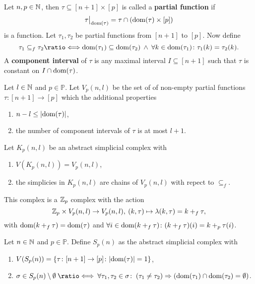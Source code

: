 \begin{defin}
  Let $n, p \in \mathbb{N}$, then $\tau \subseteq [n+1] \times [p]$ is called a \textbf{partial function} if \[\restr{\tau}{\dom(\tau)} = \tau \cap (\dom(\tau) \times [p])\] is a function. Let $\tau_1, \tau_2$ be partial functions from $[n+1]$ to $[p]$. Now define
  \begin{equation*}
    \tau_1 \subseteq_f \tau_2 \longeq \dom(\tau_1) \subseteq \dom(\tau_2) \: \land \: \forall k \in \dom(\tau_1)\colon \tau_1(k) = \tau_2(k).
  \end{equation*}
  A \textbf{component interval} of $\tau$ is any maximal interval $I \subseteq [n+1]$ such that $\tau$ is constant on $I \cap {\rm dom}(\tau)$.
\end{defin}

\begin{defin}
  Let $l \in \mathbb{N}$ and $p \in \mathbb{P}$. Let $V_p(n, l)$ be the set of of non-empty partial functions $\tau\colon [n+1] \to [p]$ which the additional properties
  \begin{enumerate}[label=\roman*.)]
    \item $n - l \leq |{\rm dom}(\tau)|$,
    \item the number of component intervals of $\tau$ is at most $l+1$.
  \end{enumerate}
\end{defin}

\begin{defin}
  Let $K_p(n,l)$ be an abstract simplicial complex with
  \begin{enumerate}[label=\roman*.)]
    \item $V(K_p(n,l)) = V_p(n,l)$,
    \item the simplicies in $K_p(n,l)$ are chains of $V_p(n,l)$ with repect to $\subseteq_f$.
  \end{enumerate}
  This complex is a $\mathbb{Z}_p$ complex with the action
  \begin{equation*}
    \mathbb{Z}_p \times V_p(n,l) \to V_p(n,l), \: (k, \tau) \mapsto \lambda(k, \tau) = k +_f \tau,
  \end{equation*}
  with ${\rm dom}(k +_f \tau) = {\rm dom}(\tau)$ and $\forall i\in {\rm dom}(k +_f \tau)\colon (k+_f\tau)(i) = k +_p \tau(i)$.
\end{defin}

\begin{defin}
  Let $n \in \mathbb{N}$ and $p \in \mathbb{P}$. Define $S_p(n)$ as the abstract simplicial complex with
  \begin{enumerate}[label=\roman*.)]
    \item $V(S_p(n)) = \{\tau\colon [n+1]\to [p]\colon |{\rm dom}(\tau)| = 1\}$,
    \item $\sigma \in S_p(n)\setminus\emptyset \: \longeq \: \forall \tau_1,\tau_2\in\sigma\colon \: (\tau_1 \neq \tau_2) \Rightarrow (\dom(\tau_1) \cap \dom(\tau_2) = \emptyset)$.
  \end{enumerate}
\end{defin}

